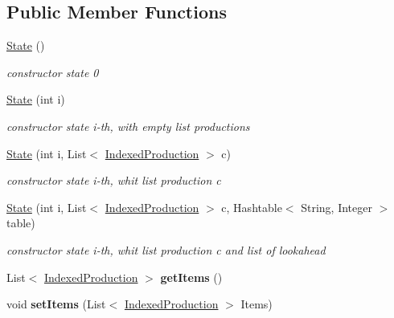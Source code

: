 \subsection*{Public Member Functions}
\begin{DoxyCompactItemize}
\item 
\hypertarget{classcontext_free_1_1parser_1_1_state_a755084c050a72d0186cd27a8f78df9a6}{\hyperlink{classcontext_free_1_1parser_1_1_state_a755084c050a72d0186cd27a8f78df9a6}{State} ()}\label{classcontext_free_1_1parser_1_1_state_a755084c050a72d0186cd27a8f78df9a6}

\begin{DoxyCompactList}\small\item\em constructor state 0 \end{DoxyCompactList}\item 
\hyperlink{classcontext_free_1_1parser_1_1_state_aa31409b43285d446a6dc1e8423ed8f65}{State} (int i)
\begin{DoxyCompactList}\small\item\em constructor state i-\/th, with empty list productions \end{DoxyCompactList}\item 
\hyperlink{classcontext_free_1_1parser_1_1_state_a7267946f249aada006c55e3c47a3772b}{State} (int i, List$<$ \hyperlink{classcontext_free_1_1parser_1_1_indexed_production}{Indexed\-Production} $>$ c)
\begin{DoxyCompactList}\small\item\em constructor state i-\/th, whit list production c \end{DoxyCompactList}\item 
\hyperlink{classcontext_free_1_1parser_1_1_state_ab2b42f6581c76d56a2a6b31b8f9b5961}{State} (int i, List$<$ \hyperlink{classcontext_free_1_1parser_1_1_indexed_production}{Indexed\-Production} $>$ c, Hashtable$<$ String, Integer $>$ table)
\begin{DoxyCompactList}\small\item\em constructor state i-\/th, whit list production c and list of lookahead \end{DoxyCompactList}\item 
\hypertarget{classcontext_free_1_1parser_1_1_state_af1362b89e4973fd940a1a6ba440e9c9e}{List$<$ \hyperlink{classcontext_free_1_1parser_1_1_indexed_production}{Indexed\-Production} $>$ {\bfseries get\-Items} ()}\label{classcontext_free_1_1parser_1_1_state_af1362b89e4973fd940a1a6ba440e9c9e}

\item 
\hypertarget{classcontext_free_1_1parser_1_1_state_ac5d2c09a67b8bba054456a652964735e}{void {\bfseries set\-Items} (List$<$ \hyperlink{classcontext_free_1_1parser_1_1_indexed_production}{Indexed\-Production} $>$ Items)}\label{classcontext_free_1_1parser_1_1_state_ac5d2c09a67b8bba054456a652964735e}


\end{DoxyCompactItemize}
